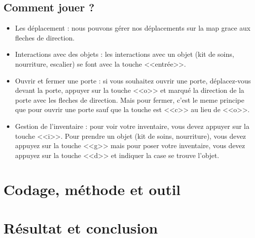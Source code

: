 \documentclass[12pt]{report}
\begin{document}
	\section{Comment jouer ?}
		\begin{itemize}
			\item{Les déplacement :}
				nous pouvons gérer nos déplacements sur la map grace aux fleches de direction. 
			\item{Interactions avec des objets :}	
				les interactions avec un objet (kit de soins, nourriture, escalier) se font avec la touche <<entrée>>.
			\item{Ouvrir et fermer une porte :}	
				si vous souhaitez ouvrir une porte, déplacez-vous devant la porte, appuyer sur la touche <<o>> et marqué la direction de la porte avec les fleches de direction.
				Mais pour fermer, c'est le meme principe que pour ouvrir une porte sauf que la touche est <<c>> au lieu de <<o>>.
			\item{Gestion de l'inventaire :}
				pour voir votre inventaire, vous devez appuyer sur la touche <<i>>. Pour prendre un objet (kit de soins, nourriture), vous devez appuyez sur la touche <<g>> mais pour poser votre inventaire, vous devez appuyez sur la touche <<d>> et indiquer la case  se trouve l'objet.
		\end{itemize}
		
		
\chapter{Codage, méthode et outil}

\chapter{Résultat et conclusion}
\end{document}
